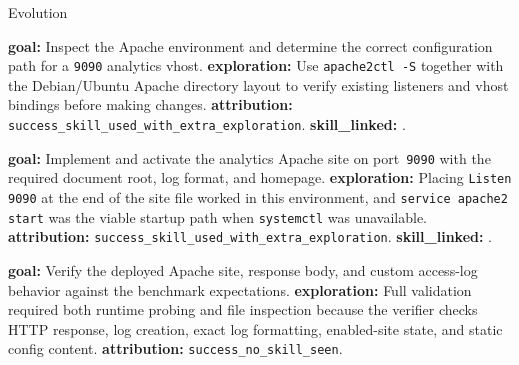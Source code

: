 \begin{svpromptbox}{Evolution}
\svpartsep
{}

\svpartsep
{}
\begin{enumerate}[label=\textnormal{[\arabic*]}, leftmargin=*]
    \item \textbf{goal:} Inspect the Apache environment and determine the correct configuration path for a \texttt{9090} analytics vhost. \textbf{exploration:} Use \texttt{apache2ctl -S} together with the Debian/Ubuntu Apache directory layout to verify existing listeners and vhost bindings before making changes. \textbf{attribution:} \texttt{success\_skill\_used\_with\_extra\_exploration}. \textbf{skill\_linked:} .
    \item \textbf{goal:} Implement and activate the analytics Apache site on port~\texttt{9090} with the required document root, log format, and homepage. \textbf{exploration:} Placing \texttt{Listen 9090} at the end of the site file worked in this environment, and \texttt{service apache2 start} was the viable startup path when \texttt{systemctl} was unavailable. \textbf{attribution:} \texttt{success\_skill\_used\_with\_extra\_exploration}. \textbf{skill\_linked:} .
    \item \textbf{goal:} Verify the deployed Apache site, response body, and custom access-log behavior against the benchmark expectations. \textbf{exploration:} Full validation required both runtime probing and file inspection because the verifier checks HTTP response, log creation, exact log formatting, enabled-site state, and static config content. \textbf{attribution:} \texttt{success\_no\_skill\_seen}.
\end{enumerate}


\end{svpromptbox}
